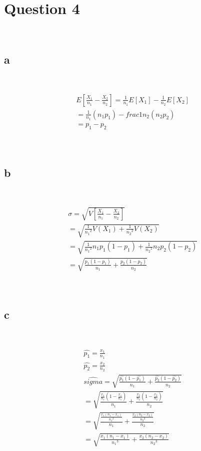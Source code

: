 \documentclass{article}
\begin{document}
\newpage

\section*{Question 4}

~

\subsection*{a}

~

\begin{align*}
    &E[\frac{X_1}{n_1}-\frac{X_2}{n_2}]=\frac{1}{n_1}E[X_1]-\frac{1}{n_2}E[X_2]\\
    &=\frac{1}{n_1}(n_1p_1)-frac{1}{n_2}(n_2p_2)\\
    &=p_1-p_2\\
\end{align*}

~

\subsection*{b}

~

\begin{align*}
    &\sigma=\sqrt{V[\frac{X_1}{n_1}-\frac{X_2}{n_2}]}\\
    &=\sqrt{\frac{1}{{n_1}^2}V(X_1)+\frac{1}{{n_2}^2}V(X_2)}\\
    &=\sqrt{\frac{1}{{n_1}^2}n_1p_1(1-p_1)+\frac{1}{{n_2}^2}n_2p_2(1-p_2)}\\
    &=\sqrt{\frac{p_1(1-p_1)}{n_1}+\frac{p_2(1-p_2)}{n_2}}\\
\end{align*}

~

\subsection*{c}

~

\begin{align*}
    &\hat{p_1}=\frac{x_1}{n_1}\\
    &\hat{p_2}=\frac{x_2}{n_2}\\
    &\hat{sigma}=\sqrt{\frac{\hat{p_1}(1-\hat{p_1})}{n_1}+\frac{\hat{p_2}(1-\hat{p_2})}{n_2}}\\
    &=\sqrt{\frac{\frac{x_1}{n_1}(1-\frac{x_1}{n_1})}{n_1}+\frac{\frac{x_2}{n_2}(1-\frac{x_2}{n_2})}{n_2}}\\
    &=\sqrt{\frac{\frac{x_1(n_1-x_1)}{{n_1}^2}}{n_1}+\frac{\frac{x_2(n_2-x_2)}{{n_2}^2}}{n_2}}\\
    &=\sqrt{\frac{x_1(n_1-x_1)}{{n_1}^3}+\frac{x_2(n_2-x_2)}{{n_2}^3}}\\
\end{align*}
\end{document}
